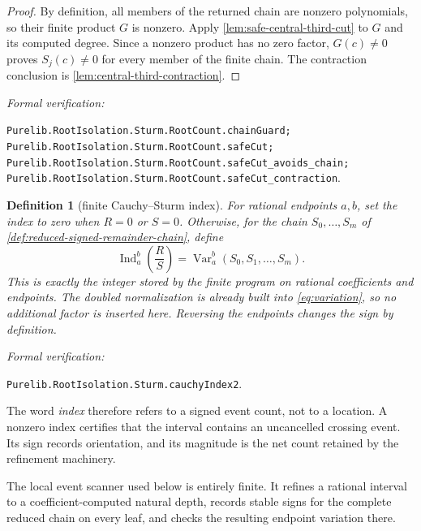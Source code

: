 \documentclass[11pt]{article}
\newtheorem{definition}[theorem]{Definition}
\newcommand{\Ind}{\operatorname{Ind}}
\newcommand{\Var}{\operatorname{Var}}
\newcommand{\leanref}[1]{\par\smallskip\noindent
  \emph{Formal verification:}\par\nobreak
  {\raggedright\nolinkurl{#1}.\par}}
\begin{document}
\begin{proof}
By definition, all members of the returned chain are nonzero polynomials,
so their finite product $G$ is nonzero.  Apply
\cref{lem:safe-central-third-cut} to $G$ and its computed degree.  Since a
nonzero product has no zero factor, $G(c)\ne0$ proves $S_j(c)\ne0$ for every
member of the finite chain.  The contraction conclusion is
\cref{lem:central-third-contraction}.
\end{proof}

\leanref{Purelib.RootIsolation.Sturm.RootCount.chainGuard;
Purelib.RootIsolation.Sturm.RootCount.safeCut;
Purelib.RootIsolation.Sturm.RootCount.safeCut_avoids_chain;
Purelib.RootIsolation.Sturm.RootCount.safeCut_contraction}

\begin{definition}[finite Cauchy--Sturm index]
\label{def:index}
For rational endpoints $a,b$, set the index to zero when $R=0$ or $S=0$.
Otherwise, for the chain $S_0,\ldots,S_m$ of
\cref{def:reduced-signed-remainder-chain}, define
\[
       \Ind_a^b\!\left(\frac{R}{S}\right)
          =\Var_a^b(S_0,S_1,\dots,S_m).
\]
This is exactly the integer stored by the finite program on rational
coefficients and endpoints.  The doubled
normalization is already built into \eqref{eq:variation}, so no additional
factor is inserted here.  Reversing the endpoints changes the sign by
definition.
\end{definition}

\leanref{Purelib.RootIsolation.Sturm.cauchyIndex2}

The word \emph{index} therefore refers to a signed event count, not to a
location.  A nonzero index certifies that the interval contains an
uncancelled crossing event.  Its sign records orientation, and its magnitude
is the net count retained by the refinement machinery.

The local event scanner used below is entirely finite.  It
refines a rational interval to a coefficient-computed natural depth, records
stable signs for the complete reduced chain on every leaf, and checks the
resulting endpoint variation there.
\end{document}
